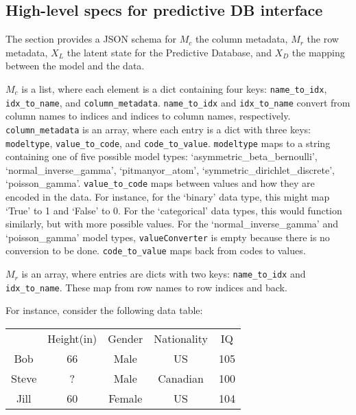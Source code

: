\documentclass[11pt]{article}
\begin{document}
\subsection{High-level specs for predictive DB interface}

The section provides a JSON schema for $M_c$ the column metadata, $M_r$ the row metadata, 
$X_L$ the latent state for the Predictive Database, and $X_D$ the mapping between the model and the data. 

$M_c$ is a list, where each element is a dict containing four keys: \texttt{name\_to\_idx}, \texttt{idx\_to\_name}, and \texttt{column\_metadata}.  
%
\texttt{name\_to\_idx} and \texttt{idx\_to\_name} convert from column names to indices and indices to 
column names, respectively. 
%
\texttt{column\_metadata} is an array, where each entry is a dict with three keys: \texttt{modeltype}, \texttt{value\_to\_code}, and \texttt{code\_to\_value}. \texttt{modeltype} maps to a string containing one of five possible model types: `asymmetric\_beta\_bernoulli', `normal\_inverse\_gamma', `pitmanyor\_atom', `symmetric\_dirichlet\_discrete', `poisson\_gamma'.
\texttt{value\_to\_code} maps between values and how they are encoded in the data. For instance, for the `binary' data type, this might map `True' to 1 and `False' to 0. For the `categorical' data types, this would function similarly, but with more possible values. For the `normal\_inverse\_gamma' and `poisson\_gamma' model types, \texttt{valueConverter} is empty because there is no conversion to be done. \texttt{code\_to\_value} maps back from codes to values. 

 
$M_r$ is an array, where entries are dicts with two keys: \texttt{name\_to\_idx} and \texttt{idx\_to\_name}. These map from row names to row indices and back. 

For instance, consider the following data table: 
\begin{table}[h!]
\begin{center}
\begin{tabular}{c c c c c}
		& Height(in)		& Gender		& Nationality	& IQ  \\
Bob		&	66			& Male		& US			& 105 \\
Steve	& ?				& Male		& Canadian	& 100 \\ 
Jill		& 60				& Female		& US			& 104 \\
\end{tabular}
\end{center}
\end{table}
\FloatBarrier
\end{document}
